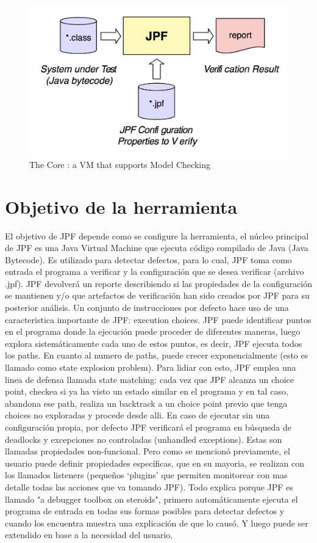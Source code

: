\documentclass[runningheads]{llncs}
\begin{document}
\begin{figure}
\includegraphics[width=\textwidth]{fig1.png}
\caption{The Core : a VM that supports Model Checking} \label{fig1}
\end{figure}

\section{Objetivo de la herramienta}



El objetivo de JPF depende como se configure la herramienta, el n\'ucleo principal de JPF es una Java Virtual Machine que ejecuta c\'odigo compilado de Java (Java Bytecode). Es utilizado para detectar defectos, para lo cual, JPF toma como entrada el programa a verificar y la configuraci\'on que se desea verificar (archivo .jpf). JPF devolver\'a un reporte describiendo si las propiedades de la configuraci\'on se mantienen y/o que artefactos de verificaci\'on han sido creados por JPF para su posterior an\'alisis. 
Un conjunto de instrucciones por defecto hace uso de una caracteristica importante de JPF: execution choices. JPF puede identificar puntos en el programa donde la ejecuci\'on puede proceder de diferentes maneras, luego explora sistem\'aticamente cada uno de estos puntos, es decir, JPF ejecuta todos los paths. En cuanto al numero de paths, puede crecer exponencialmente (esto es llamado como state explosion problem). Para lidiar con esto, JPF emplea una linea de defensa llamada state matching: cada vez que JPF alcanza un choice point, checkea si ya ha visto un estado similar en el programa y en tal caso, abandona ese path, realiza un backtrack a un choice point previo que tenga choices no exploradas y procede desde alli. 
En caso de ejecutar sin una configuraci\'on propia, por defecto JPF verificar\'a el programa en b\'usqueda de deadlocks y excepciones no controladas (unhandled exceptions). Estas son llamadas propiedades non-funcional. Pero como se mencion\'o previamente, el usuario puede definir propiedades espec\'ificas, que en su mayoria, se realizan con los llamados listeners (peque\~nos ‘plugins’ que permiten monitorear con mas detalle todas las acciones que va tomando JPF). Todo explica porque JPF es llamado "a debugger toolbox on steroids", primero autom\'aticamente ejecuta el programa de entrada en todas sus formas posibles para detectar defectos y cuando los encuentra muestra una explicaci\'on de que lo caus\'o. Y luego puede ser extendido en base a la necesidad del usuario.
\end{document}
